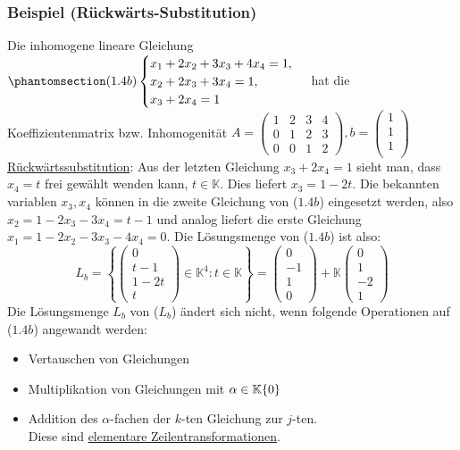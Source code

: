 \subsubsection{Beispiel (Rückwärts-Substitution)}
\label{reverse}
Die inhomogene lineare Gleichung
$\phantomsection\label{1.4b}(1.4b)\begin{cases}x_1+2x_2+3x_3+4x_4=1,\\ x_2+2x_3+3x_4=1,\\x_3+2x_4=1\end{cases}$ hat die Koeffizientenmatrix bzw. Inhomogenität $A=\left(\begin{array}{cccc}1 & 2 & 3 & 4 \\ 0 & 1 & 2 & 3\\ 0 & 0 & 1 & 2\end{array}\right), b=\left(\begin{array}{c}1\\ 1\\ 1\\\end{array}\right)$\\
\underline{Rückwärtssubstitution}: Aus der letzten Gleichung $x_3+2x_4=1$ sieht man, dass $x_4=t$ frei gewählt wenden kann, $t\in \mathbb{K}$.  Dies liefert $x_3=1-2t$.  Die bekannten variablen $x_3,x_4$ können in die zweite Gleichung von (\hyperref[1.4b]{$1.4b$}) eingesetzt werden, also $x_2 = 1-2x_3-3x_4=t-1$ und analog liefert die erste Gleichung $x_1=1-2x_2-3x_3-4x_4=0$.  Die Lösungsmenge von ($1.4b$) ist also:\[L_b=\left\{\left(\begin{array}{c}0\\ t-1\\ 1-2t\\ t\end{array}\right)\in \mathbb{K}^4:t\in\mathbb{K}\right\} = \left(\begin{array}{c}0\\ -1\\ 1\\ 0\end{array}\right)+\mathbb{K}\left(\begin{array}{c}0\\ 1\\ -2 \\1\end{array}\right)\]
Die Lösungsmenge $L_b$ von (\hyperref[Lb]{$L_b$}) ändert sich nicht, wenn folgende Operationen auf (\hyperref[1.4b]{$1.4b$}) angewandt werden:
\begin{itemize}
\item Vertauschen von Gleichungen
\item Multiplikation von Gleichungen mit $\alpha \in \mathbb{K}\\\{0\}$
\item Addition des $\alpha$-fachen der $k$-ten Gleichung zur $j$-ten.\\
Diese sind \underline{elementare Zeilentransformationen}.
\end{itemize}
